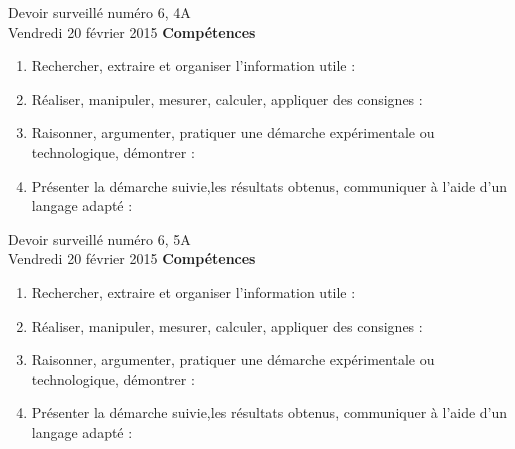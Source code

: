 \documentclass[a4paper,10pt]{article}
\begin{document}





\begin{feuilleDS}{Devoir surveillé numéro 6, 4A\\ \small Vendredi 20 février 2015}
\vspace{1cm}
{\bf Compétences}
\begin{enumerate}
    \item
        Rechercher, extraire et organiser l'information utile : 
    \item
        Réaliser, manipuler, mesurer, calculer, appliquer des consignes : 
    \item
        Raisonner, argumenter, pratiquer une démarche expérimentale ou technologique, démontrer :
    \item 
        Présenter la démarche suivie,les résultats obtenus, communiquer à l'aide d’un langage adapté : 
\end{enumerate}
\end{feuilleDS}

\begin{feuilleDS}{Devoir surveillé numéro 6, 5A\\ \small Vendredi 20 février 2015}
\vspace{1cm}
{\bf Compétences}
\begin{enumerate}
    \item
        Rechercher, extraire et organiser l'information utile : 
    \item
        Réaliser, manipuler, mesurer, calculer, appliquer des consignes : 
    \item
        Raisonner, argumenter, pratiquer une démarche expérimentale ou technologique, démontrer :
    \item 
        Présenter la démarche suivie,les résultats obtenus, communiquer à l'aide d’un langage adapté : 
\end{enumerate}
\end{feuilleDS}
\end{document}
